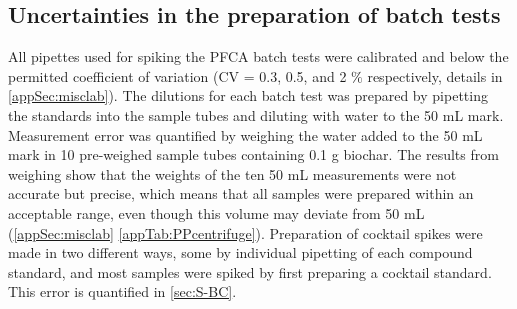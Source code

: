 \subsection{Uncertainties in the preparation of batch tests}
All pipettes used for spiking the PFCA batch tests were calibrated and below the permitted coefficient of variation (CV = 0.3, 0.5, and 2 $\%$ respectively, details in \cref{appSec:misclab}). The dilutions for each batch test was prepared by pipetting the standards into the sample tubes and diluting with water to the 50 mL mark. Measurement error was quantified by weighing the water added to the 50 mL mark in 10 pre-weighed sample tubes containing 0.1 g biochar. The results from weighing show that the weights of the ten 50 mL measurements were not accurate but precise, which means that all samples were prepared within an acceptable range, even though this volume may deviate from 50 mL (\cref{appSec:misclab} \cref{appTab:PPcentrifuge}). Preparation of cocktail spikes were made in two different ways, some by individual pipetting of each compound standard, and most samples were spiked by first preparing a cocktail standard. This error is quantified in \cref{sec:S-BC}. 


